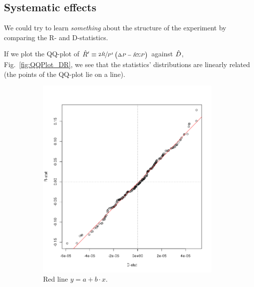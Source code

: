 \documentclass{article}
\begin{document}
\subsection{Systematic effects}
We could try to learn \emph{something} about the structure of the experiment by comparing the R- and D-statistics.

If we plot the QQ-plot of $\R*' \equiv \sfrac{2\R*}{P^t\bkt{\DP - \R*\SP}}$ against $\D*$, Fig.~\ref{fig:QQPlot_DR}, we see that the statistics' distributions are linearly related (the points of the QQ-plot lie on a line).
\begin{figure}[h]
\centering
\begin{subfigure}{.5\textwidth}
\includegraphics[scale=.5]{R_D_QQPlot}
\caption{Red line $y = a + b\cdot x$.}
\end{subfigure}~
\begin{subfigure}{.5\textwidth}

\end{subfigure}
\end{figure}
\end{document}
